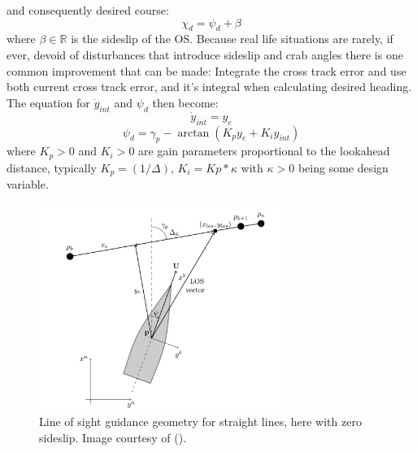 and consequently desired course:
\begin{equation}
    \chi_d = \psi_d + \beta
\end{equation}
where $\beta \in \mathbb{R}$ is the sideslip of the \gls{OS}. Because real life situations are rarely, if ever, devoid of disturbances that introduce
sideslip and crab angles there is one common improvement that can be made: Integrate the cross track error and use both current cross track error, 
and it's integral when calculating desired heading. The equation for $\dot{y}_{int}$ and $\psi_d$ then become:
\begin{equation}
    \dot{y}_{int} = y_e
\end{equation}
\begin{equation}
    \psi_d = \gamma_p - \arctan(K_{p}y_e + K_{i} y_{int})
\end{equation}
where $K_{p} > 0$ and $K_{i} > 0$ are gain parameters proportional to the lookahead distance, typically $K_p = (1/\varDelta)$, $K_i = Kp*\kappa$
with $\kappa > 0$ being some design variable.

\begin{figure}
    \centering
    \includegraphics[width = 0.7\textwidth]{Images/LOS_decomp.png}
    \caption{Line of sight guidance geometry for straight lines, here with zero sideslip. Image courtesy of (\cite{lekkas2013line}).} %
    \label{FIG: LOS_decomp}
\end{figure}

